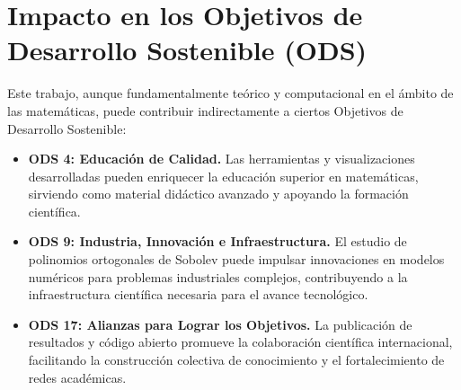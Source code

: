 \section{Impacto en los Objetivos de Desarrollo Sostenible (ODS)}
Este trabajo, aunque fundamentalmente teórico y computacional en el ámbito de las matemáticas, puede contribuir indirectamente a ciertos Objetivos de Desarrollo Sostenible\cite{UN2015SDG}:

\begin{itemize}
	\item \textbf{ODS 4: Educación de Calidad.}
	      Las herramientas y visualizaciones desarrolladas pueden enriquecer la educación superior en matemáticas, sirviendo como material didáctico avanzado y apoyando la formación científica\cite{UN2015SDG4}.

	\item \textbf{ODS 9: Industria, Innovación e Infraestructura.}
	      El estudio de polinomios ortogonales de Sobolev puede impulsar innovaciones en modelos numéricos para problemas industriales complejos, contribuyendo a la infraestructura científica necesaria para el avance tecnológico\cite{UN2015SDG9}.

	\item \textbf{ODS 17: Alianzas para Lograr los Objetivos.}
	      La publicación de resultados y código abierto promueve la colaboración científica internacional, facilitando la construcción colectiva de conocimiento y el fortalecimiento de redes académicas\cite{UN2015SDG17}.
\end{itemize}

